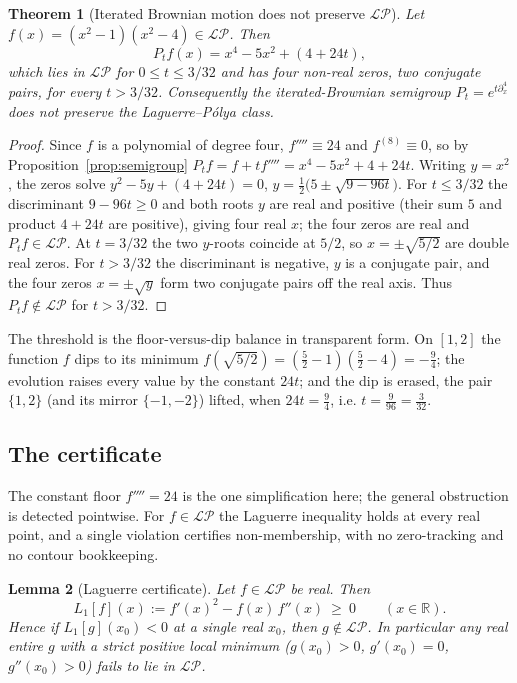 \documentclass[11pt,reqno]{amsart}
\theoremstyle{plain}
\newtheorem{theorem}{Theorem}[section]
\newtheorem{lemma}[theorem]{Lemma}
\theoremstyle{definition}
\theoremstyle{remark}
\newcommand{\R}{\mathbb R}
\newcommand{\LP}{\mathcal{LP}}
\begin{document}
\begin{theorem}[Iterated Brownian motion does not preserve $\LP$]
\label{thm:witness}
Let $f(x)=(x^2-1)(x^2-4)\in\LP$. Then
\begin{equation}\label{eq:witness}
   P_tf(x)=x^4-5x^2+(4+24t),
\end{equation}
which lies in $\LP$ for $0\le t\le 3/32$ and has four non-real zeros,
two conjugate pairs, for every $t>3/32$. Consequently the iterated-Brownian
semigroup $P_t=e^{t\partial_x^4}$ does not preserve the Laguerre--P\'olya
class.
\end{theorem}

\begin{proof}
Since $f$ is a polynomial of degree four, $f''''\equiv24$ and $f^{(8)}\equiv0$,
so by Proposition~\ref{prop:semigroup} $P_tf=f+tf''''=x^4-5x^2+4+24t$. Writing
$y=x^2$, the zeros solve $y^2-5y+(4+24t)=0$, $y=\tfrac12\bigl(5\pm\sqrt{9-96t}
\bigr)$. For $t\le3/32$ the discriminant $9-96t\ge0$ and both roots $y$ are
real and positive (their sum $5$ and product $4+24t$ are positive), giving four
real $x$; the four zeros are real and $P_tf\in\LP$. At $t=3/32$ the two $y$-roots
coincide at $5/2$, so $x=\pm\sqrt{5/2}$ are double real zeros. For $t>3/32$ the
discriminant is negative, $y$ is a conjugate pair, and the four zeros
$x=\pm\sqrt{y}$ form two conjugate pairs off the real axis. Thus $P_tf\notin\LP$
for $t>3/32$.
\end{proof}

The threshold is the floor-versus-dip balance in transparent form. On
$[1,2]$ the function $f$ dips to its minimum
$f(\sqrt{5/2})=(\tfrac52-1)(\tfrac52-4)=-\tfrac94$; the evolution raises every
value by the constant $24t$; and the dip is erased, the pair $\{1,2\}$ (and
its mirror $\{-1,-2\}$) lifted, when $24t=\tfrac94$, i.e.
$t=\tfrac{9}{96}=\tfrac3{32}$.

\subsection{The certificate}
The constant floor $f''''=24$ is the one simplification here; the general
obstruction is detected pointwise. For $f\in\LP$ the Laguerre
inequality holds at every real point, and a single violation certifies
non-membership, with no zero-tracking and no contour bookkeeping.

\begin{lemma}[Laguerre certificate]\label{lem:laguerre}
Let $f\in\LP$ be real. Then
\[
   L_1[f](x):=f'(x)^2-f(x)\,f''(x)\ \ge\ 0\qquad(x\in\R).
\]
Hence if $L_1[g](x_0)<0$ at a single real $x_0$, then $g\notin\LP$. In
particular any real entire $g$ with a strict positive local minimum
($g(x_0)>0$, $g'(x_0)=0$, $g''(x_0)>0$) fails to lie in $\LP$.
\end{lemma}
\end{document}
